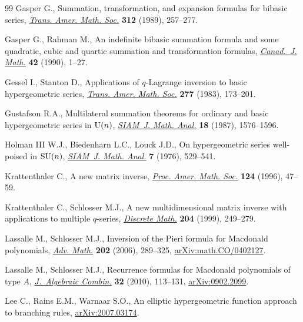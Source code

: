 \documentclass[pdftex]{sigma}%
\numberwithin{equation}{section}
\begin{document}
\begin{thebibliography}{99}
Gasper G., Summation, transformation, and expansion formulas for bibasic
 series, \href{https://doi.org/10.2307/2001216}{\textit{Trans. Amer. Math. Soc.}} \textbf{312} (1989), 257--277.

Gasper G., Rahman M., An indefinite bibasic summation formula and some
 quadratic, cubic and quartic summation and transformation formulas,
 \href{https://doi.org/10.4153/CJM-1990-001-5}{\textit{Canad.~J. Math.}} \textbf{42} (1990), 1--27.

Gessel I., Stanton D., Applications of {$q$}-{L}agrange inversion to basic
 hypergeometric series, \href{https://doi.org/10.2307/1999351}{\textit{Trans. Amer. Math. Soc.}} \textbf{277} (1983),
 173--201.

Gustafson R.A., Multilateral summation theorems for ordinary and basic
 hypergeometric series in {${\rm U}(n)$}, \href{https://doi.org/10.1137/0518114}{\textit{SIAM~J. Math. Anal.}}
 \textbf{18} (1987), 1576--1596.

Holman III W.J., Biedenharn L.C., Louck J.D., On hypergeometric series
 well-poised in {${\rm SU}(n)$}, \href{https://doi.org/10.1137/0507043}{\textit{SIAM~J. Math. Anal.}} \textbf{7}
 (1976), 529--541.

Krattenthaler C., A new matrix inverse, \href{https://doi.org/10.1090/S0002-9939-96-03042-0}{\textit{Proc. Amer. Math. Soc.}}
 \textbf{124} (1996), 47--59.

Krattenthaler C., Schlosser M.J., A new multidimensional matrix inverse with
 applications to multiple {$q$}-series, \href{https://doi.org/10.1016/S0012-365X(98)00374-4}{\textit{Discrete Math.}} \textbf{204}
 (1999), 249--279.

Lassalle M., Schlosser M.J., Inversion of the {P}ieri formula for {M}acdonald
 polynomials, \href{https://doi.org/10.1016/j.aim.2005.03.009}{\textit{Adv. Math.}} \textbf{202} (2006), 289--325,
 \href{https://arxiv.org/abs/math.CO/0402127}{arXiv:math.CO/0402127}.

Lassalle M., Schlosser M.J., Recurrence formulas for {M}acdonald polynomials of
 type {$A$}, \href{https://doi.org/10.1007/s10801-009-0207-y}{\textit{J.~Algebraic Combin.}} \textbf{32} (2010), 113--131,
 \href{https://arxiv.org/abs/0902.2099}{arXiv:0902.2099}.

Lee C., Rains E.M., Warnaar S.O., An elliptic hypergeometric function approach to branching rules, \href{https://arxiv.org/abs/2007.03174}{arXiv:2007.03174}.



\end{thebibliography}
\end{document}
